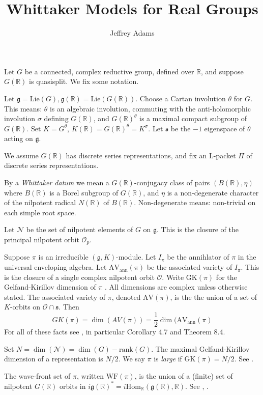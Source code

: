 \documentclass[10pt,leqno]{article}
\newcommand{\Hom}{\mathrm{Hom}}
\renewcommand{\O}{\mathcal O}
\newcommand{\R}{\mathbb R}
\newcommand{\N}{\mathcal N}
\newcommand{\Lie}{\mathrm{Lie}}
\newcommand{\g}{\mathfrak g}
\newcommand{\s}{\mathfrak s}
\newcommand{\AV}{\mathrm{AV}}
\newcommand{\WF}{\mathrm{WF}}
\newcommand{\AVann}{\mathrm{AV}_{\mathrm{ann}}}
\newcommand{\GK}{\mathrm{GK}}
\newcommand{\Op}{\O_p}
\begin{document}
\title{Whittaker Models for Real Groups}
\author{Jeffrey Adams}
\maketitle

Let $G$ be a connected, complex reductive group, defined over $\R$, and suppose $G(\R)$ is quasisplit.
We fix some notation.

Let $\g=\Lie(G), \g(\R)=\Lie(G(\R))$. Choose a Cartan involution $\theta$ for $G$. This means:
$\theta$ is an algebraic involution, commuting with the anti-holomorphic involution $\sigma$ defining $G(\R)$,
and $G(\R)^\theta$ is a maximal compact subgroup of $G(\R)$. Set $K=G^\theta$, $K(\R)=G(\R)^\theta=K^\sigma$.
Let $\s$ be the $-1$ eigenspace of $\theta$ acting on $\g$.

We assume $G(\R)$ has discrete series representations, and fix an L-packet $\Pi$ of discrete series representations.

By a  {\it Whittaker datum} we mean a $G(\R)$-conjugacy class of pairs  $(B(\R),\eta)$ where $B(\R)$ is a
Borel subgroup of $G(\R)$, 
and $\eta$ is a non-degenerate character of the nilpotent radical $N(\R)$ of $B(\R)$. Non-degenerate means: non-trivial on each simple root space.


Let $\N$ be the set of nilpotent elements of $G$ on $\g$.
This is the closure of the principal nilpotent orbit $\Op$.

Suppose $\pi$ is an irreducible $(\g,K)$-module. Let $I_\pi$ be the annihlator of $\pi$ in the universal enveloping algebra.
Let $\AVann(\pi)$ be the associated variety of $I_\pi$. 
This is the closure of a single complex nilpotent orbit $\O$.
Write $\GK(\pi)$ for the Gelfand-Kirillov dimension of $\pi$
\cite{vogan-gelfand-kirillov}. 
All dimensions are complex unless otherwise stated.
The associated variety of $\pi$, denoted $\AV(\pi)$, is the  the union of a set of
$K$-orbits on $\O\cap\s$.
Then
$$
GK(\pi)=\dim(AV(\pi))=\frac12\dim(\AVann(\pi)
$$
For all of these facts see \cite{vogan_bowdoin}, in particular Corollary 4.7 and Theorem 8.4.

Set $N=\dim(\N)=\dim(G)-\mathrm{rank}(G)$. The maximal Gelfand-Kirillov dimension of a representation is $N/2$.
We say $\pi$ is {\it large} if $\GK(\pi)=N/2$. See \cite[Section 6]{Vogan78}.


The wave-front set of $\pi$, written $\WF(\pi)$, is the union of a (finite) set of nilpotent $G(\R)$ orbits in
$i\g(\R)^*=i\Hom_\R(\g(\R),\R)$. See \cite{howe_wave_front}, \cite{bv_local_structure}.
\end{document}
